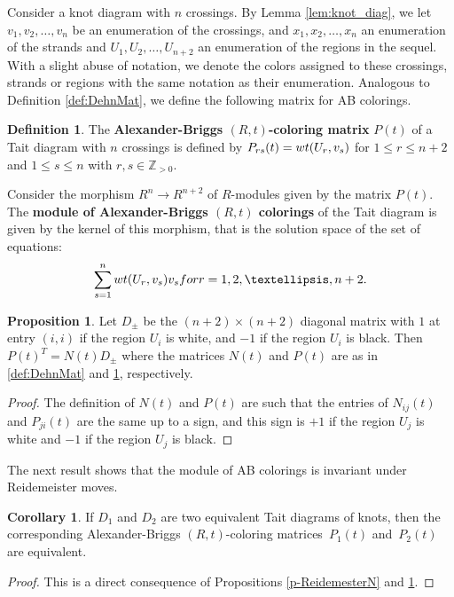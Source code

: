 \documentclass[11pt,a4paper]{article}
\newcommand{\wt}{\textnormal{wt}}
\theoremstyle{definition}
\newtheorem{corollary}[theorem]{Corollary}
\newtheorem{proposition}[theorem]{Proposition}
\newtheorem{definition}[theorem]{Definition}
\newcommand{\numberset}{\mathbb}
\newcommand{\Z}{\numberset{Z}}
\begin{document}
Consider a knot diagram with $n$ crossings. By Lemma \ref{lem:knot_diag}, we let $v_1,v_2, \ldots ,v_n$ be an enumeration of the crossings, and $x_1,x_2, \ldots ,x_n$ an enumeration of the strands and $U_1,U_2, \ldots , U_{n+2}$ an enumeration of the regions in the sequel. With a slight abuse of notation, we denote the colors assigned to these crossings, strands or regions with the same notation as their enumeration. Analogous to Definition \ref{def:DehnMat}, we define the following matrix for AB colorings.

\begin{definition}
\label{def:ABmatrix}
The \textbf{Alexander-Briggs $(R,t)$-coloring matrix} $P(t)$ of a Tait diagram with $n$ crossings is defined by $P_{rs}(t) = \wt(U_r,v_s)$ for $1 \le r \le n+2$ and $1 \le s \le n$ with $r,s \in \Z_{>0}.$
\end{definition}

Consider the morphism $R^n \rightarrow R^{n+2}$ of $R$-modules
given by the matrix $P(t)$. The \textbf{module of Alexander-Briggs $(R,t)$ colorings} of the Tait diagram is given by the kernel of this morphism, that is the solution space of the set of equations:
$$
\sum_{s=1}^n \wt(U_r,v_s) v_s \textnormal{ for } r=1,2,\ldots , n+2.
$$

\begin{proposition}
\label{p-PN}
Let $D_{\pm}$ be the $(n+2)\times (n+2)$ diagonal matrix with $1$ at entry $(i,i)$ if the region $U_i$ is white, and $-1$ if the region $U_i$ is black. Then $P(t)^T = N(t)D_{\pm}$ where the matrices $N(t)$ and $P(t)$ are as in \ref{def:DehnMat} and \ref{def:ABmatrix}, respectively.
\end{proposition}

\begin{proof}
The definition of $N(t)$ and $P(t)$ are such that the entries of $N_{ij}(t)$ and $P_{ji}(t)$ are the same up to a sign, 
and this sign is $+1$ if the region $U_j$ is white and $-1$ if the region $U_j$ is black.
\end{proof}

The next result shows that the module of AB colorings is invariant under Reidemeister moves.

\begin{corollary}
\label{cor:ReidemesterP}
If $D_1$ and $D_2$ are two equivalent Tait diagrams of knots, 
then the corresponding Alexander-Briggs $(R,t)$-coloring matrices~$P_1(t)$ and~$P_2(t)$ are equivalent.
\end{corollary}
\begin{proof}
This is a direct consequence of Propositions \ref{p-ReidemesterN} and \ref{p-PN}.
\end{proof}
\end{document}
